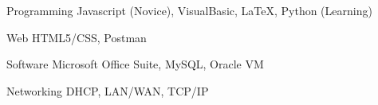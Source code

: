 


\begin{cvskills}


\cvskill
{Programming} %
{Javascript (Novice), VisualBasic, LaTeX, Python (Learning)} %


\cvskill
{Web} %
{HTML5/CSS, Postman} %


\cvskill
{Software} %
{Microsoft Office Suite, MySQL, Oracle VM} %


\cvskill
{Networking} %
{DHCP, LAN/WAN, TCP/IP} %


\end{cvskills}